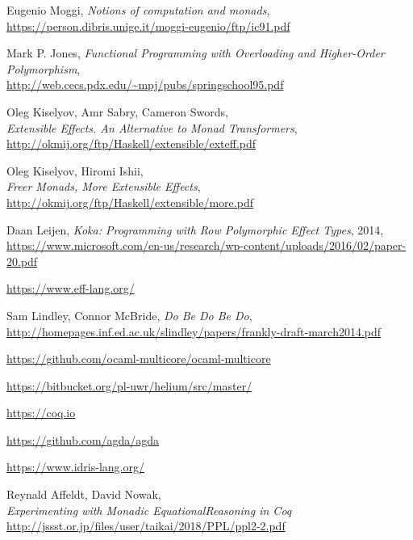 \documentclass[declaration,inz,english,shortabstract]{iithesis}
\begin{document}
\begin{thebibliography}{1}
        Eugenio Moggi, \textit{Notions of computation and monads}, \\
        \url{https://person.dibris.unige.it/moggi-eugenio/ftp/ic91.pdf}

        Mark P. Jones,
        \textit{Functional Programming with Overloading and Higher-Order Polymorphism}, \\
        \url{http://web.cecs.pdx.edu/~mpj/pubs/springschool95.pdf}

        Oleg Kiselyov, Amr Sabry, Cameron Swords, \\
        \textit{Extensible Effects. An Alternative to Monad Transformers},
        \url{http://okmij.org/ftp/Haskell/extensible/exteff.pdf}

        Oleg Kiselyov, Hiromi Ishii, \\
        \textit{Freer Monads, More Extensible Effects}, \\
        \url{http://okmij.org/ftp/Haskell/extensible/more.pdf}

        Daan Leijen,
        \textit{Koka: Programming with Row Polymorphic Effect Types}, 2014, \\
        \url{https://www.microsoft.com/en-us/research/wp-content/uploads/2016/02/paper-20.pdf}

        \url{https://www.eff-lang.org/}

        Sam Lindley, Connor McBride, \textit{Do Be Do Be Do}, \\
        \url{http://homepages.inf.ed.ac.uk/slindley/papers/frankly-draft-march2014.pdf}

        \url{https://github.com/ocaml-multicore/ocaml-multicore}
        
        \url{https://bitbucket.org/pl-uwr/helium/src/master/}

        \url{https://coq.io}

        \url{https://github.com/agda/agda}

        \url{https://www.idris-lang.org/}

        Reynald Affeldt, David Nowak, \\
        \textit{Experimenting with Monadic EquationalReasoning in Coq} \\
        \url{http://jssst.or.jp/files/user/taikai/2018/PPL/ppl2-2.pdf}


\end{thebibliography}
\end{document}
